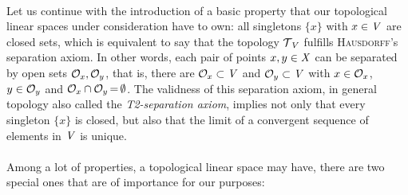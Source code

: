 \documentclass[11pt,twoside]{article}
\begin{document}
\paragraph*{} %
Let us continue with the introduction of a basic property
that our topological linear spaces under consideration have to own:
all singletons $\{x\}$ with $x \in \mathit{V}$ are closed sets,
which is equivalent to say
that the topology $\mathcal{T}_{\,\mathit{V}}$
fulfills \textsc{Hausdorff}'s separation axiom.
In other words,
each pair of points $x,y \in \mathit{X}$ can be separated
by open sets $\mathcal{O}_x, \mathcal{O}_y$,
that is,
there are $\mathcal{O}_x \subset \mathit{V}$ and $\mathcal{O}_y \subset \mathit{V}$ with
$x \in \mathcal{O}_x$,
$y \in \mathcal{O}_y$ and
$\mathcal{O}_x \cap \mathcal{O}_y {\,=\,} \emptyset$.
The validness of this separation axiom,
in general topology also called the \textit{T2-separation axiom},
implies not only
that every singleton $\{x\}$ is closed,
but also
that the limit of a convergent sequence of elements in $\mathit{V}$ is unique.

\paragraph*{}
Among a lot of properties,
a topological linear space may have,
there are two special ones
that are of importance for our purposes:
\end{document}
